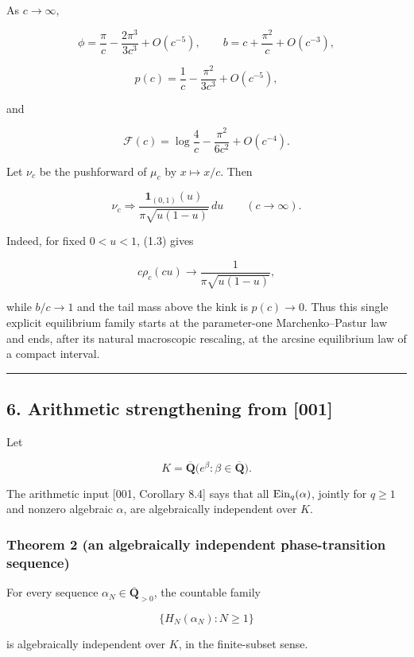 As \(c\to\infty\),

\[
\phi=\frac\pi c-\frac{2\pi^3}{3c^3}+O(c^{-5}),
\qquad
b=c+\frac{\pi^2}{c}+O(c^{-3}), \tag{DS-5.4}
\]

\[
p(c)=\frac1c-\frac{\pi^2}{3c^3}+O(c^{-5}), \tag{DS-5.5}
\]

and

\[
\mathcal F(c)=\log\frac4c-\frac{\pi^2}{6c^2}+O(c^{-4}). \tag{DS-5.6}
\]

Let \(\nu_c\) be the pushforward of \(\mu_c\) by \(x\mapsto x/c\). Then

\[
\boxed{
\nu_c\Longrightarrow
\frac{\mathbf1_{(0,1)}(u)}{\pi\sqrt{u(1-u)}}\,du
\qquad(c\to\infty).} \tag{DS-5.7}
\]

Indeed, for fixed \(0<u<1\), (1.3) gives

\[
c\rho_c(cu)\longrightarrow\frac1{\pi\sqrt{u(1-u)}},
\]

while \(b/c\to1\) and the tail mass above the kink is \(p(c)\to0\).
Thus this single explicit equilibrium family starts at the parameter-one
Marchenko--Pastur law and ends, after its natural macroscopic rescaling, at
the arcsine equilibrium law of a compact interval.

\begin{center}\rule{0.5\linewidth}{0.5pt}\end{center}

\subsection{6. Arithmetic strengthening from {[}001{]}}

Let

\[
K=\overline{\mathbf Q}
\bigl(e^\beta:\beta\in\overline{\mathbf Q}\bigr).
\]

The arithmetic input {[}001, Corollary 8.4{]} says that all
\(\operatorname{Ein}_q(\alpha)\), jointly for \(q\ge1\) and nonzero algebraic \(\alpha\),
are algebraically independent over \(K\).

\subsubsection{Theorem 2 (an algebraically independent phase-transition sequence)}

For every sequence \(\alpha_N\in\overline{\mathbf Q}_{>0}\), the countable
family

\[
\{H_N(\alpha_N):N\ge1\}
\]

is algebraically independent over \(K\), in the finite-subset sense.

